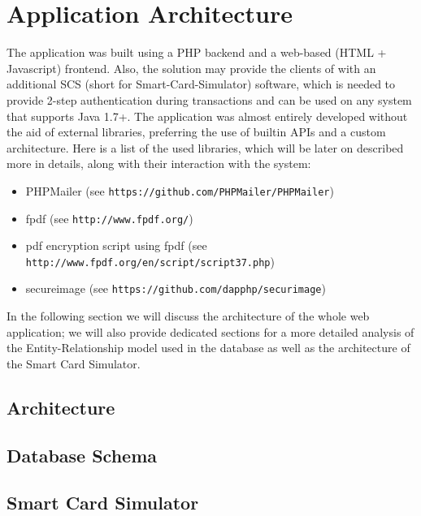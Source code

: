 \chapter{Application Architecture}\label{chapter:application_architecture}
The \gnb{} application was built using a PHP backend and a web-based (HTML + Javascript) frontend. Also, the solution may provide the clients of \gnb{} with an additional SCS (short for Smart-Card-Simulator) software, which is needed to provide 2-step authentication during transactions and can be used on any system that supports Java 1.7+.\newline
The application was almost entirely developed without the aid of external libraries, preferring the use of builtin APIs and a custom architecture. Here is a list of the used libraries, which will be later on described more in details, along with their interaction with the system:
\begin{itemize}
	\item PHPMailer (see \texttt{https://github.com/PHPMailer/PHPMailer})
	\item fpdf (see \texttt{http://www.fpdf.org/})
	\item pdf encryption script using fpdf (see \texttt{http://www.fpdf.org/en/script/script37.php})
	\item secureimage (see \texttt{https://github.com/dapphp/securimage})
\end{itemize}

In the following section we will discuss the architecture of the whole web application; we will also provide dedicated sections for a more detailed analysis of the Entity-Relationship model used in the database as well as the architecture of the Smart Card Simulator.
\section{Architecture}

\section{Database Schema}\label{section:db}

\section{Smart Card Simulator}
